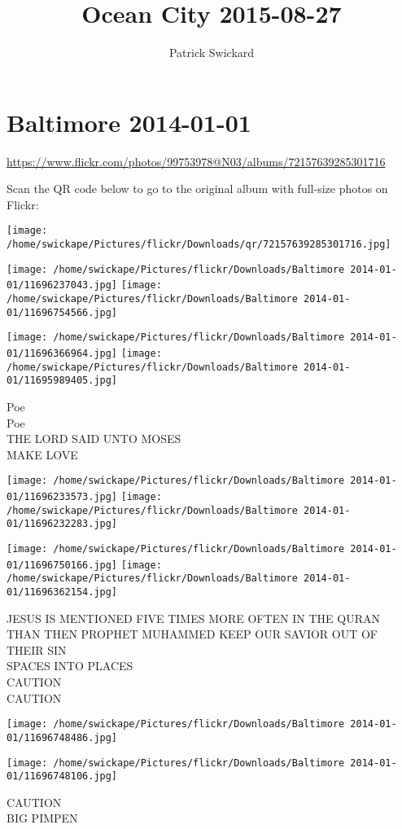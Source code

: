 \documentclass[10pt,letterpaper]{article}
\title{Ocean City 2015-08-27}
\author{Patrick Swickard}
\date{}
\begin{document}
\section*{Baltimore 2014-01-01}

\url{https://www.flickr.com/photos/99753978@N03/albums/72157639285301716}

Scan the QR code below to go to the original album with full-size photos on Flickr:

\texttt{[image: /home/swickape/Pictures/flickr/Downloads/qr/72157639285301716.jpg]}
\pagebreak

\texttt{[image: /home/swickape/Pictures/flickr/Downloads/Baltimore 2014-01-01/11696237043.jpg]}
\texttt{[image: /home/swickape/Pictures/flickr/Downloads/Baltimore 2014-01-01/11696754566.jpg]}

\texttt{[image: /home/swickape/Pictures/flickr/Downloads/Baltimore 2014-01-01/11696366964.jpg]}
\texttt{[image: /home/swickape/Pictures/flickr/Downloads/Baltimore 2014-01-01/11695989405.jpg]}

Poe\\
Poe\\
THE LORD SAID UNTO MOSES\\
MAKE LOVE
\pagebreak

\texttt{[image: /home/swickape/Pictures/flickr/Downloads/Baltimore 2014-01-01/11696233573.jpg]}
\texttt{[image: /home/swickape/Pictures/flickr/Downloads/Baltimore 2014-01-01/11696232283.jpg]}

\texttt{[image: /home/swickape/Pictures/flickr/Downloads/Baltimore 2014-01-01/11696750166.jpg]}
\texttt{[image: /home/swickape/Pictures/flickr/Downloads/Baltimore 2014-01-01/11696362154.jpg]}

JESUS IS MENTIONED FIVE TIMES MORE OFTEN IN THE QURAN THAN THEN PROPHET MUHAMMED KEEP OUR SAVIOR OUT OF THEIR SIN\\
SPACES INTO PLACES\\
CAUTION\\
CAUTION
\pagebreak

\texttt{[image: /home/swickape/Pictures/flickr/Downloads/Baltimore 2014-01-01/11696748486.jpg]}

\vspace{0.25in}
\texttt{[image: /home/swickape/Pictures/flickr/Downloads/Baltimore 2014-01-01/11696748106.jpg]}

CAUTION\\
BIG PIMPEN
\pagebreak
\end{document}

